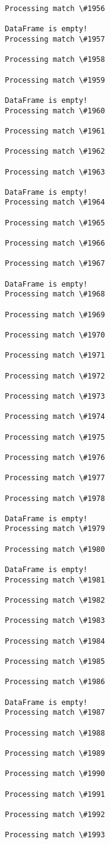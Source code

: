 \documentclass[11pt]{article}
\begin{document}
\begin{Verbatim}[commandchars=\\\{\}]
Processing match \#1956

DataFrame is empty!
Processing match \#1957

Processing match \#1958

Processing match \#1959

DataFrame is empty!
Processing match \#1960

Processing match \#1961

Processing match \#1962

Processing match \#1963

DataFrame is empty!
Processing match \#1964

Processing match \#1965

Processing match \#1966

Processing match \#1967

DataFrame is empty!
Processing match \#1968

Processing match \#1969

Processing match \#1970

Processing match \#1971

Processing match \#1972

Processing match \#1973

Processing match \#1974

Processing match \#1975

Processing match \#1976

Processing match \#1977

Processing match \#1978

DataFrame is empty!
Processing match \#1979

Processing match \#1980

DataFrame is empty!
Processing match \#1981

Processing match \#1982

Processing match \#1983

Processing match \#1984

Processing match \#1985

Processing match \#1986

DataFrame is empty!
Processing match \#1987

Processing match \#1988

Processing match \#1989

Processing match \#1990

Processing match \#1991

Processing match \#1992

Processing match \#1993


\end{Verbatim}
\end{document}
